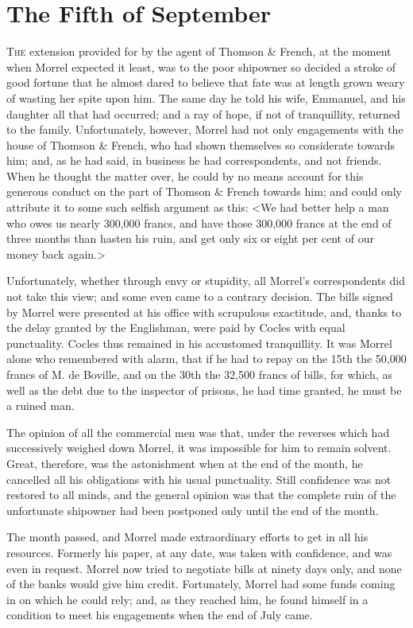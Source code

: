 \chapter{The Fifth of September} 

 \lettrine{T}{he} extension provided for by the agent of Thomson \& French, at the moment when Morrel expected it least, was to the poor shipowner so decided a stroke of good fortune that he almost dared to believe that fate was at length grown weary of wasting her spite upon him. The same day he told his wife, Emmanuel, and his daughter all that had occurred; and a ray of hope, if not of tranquillity, returned to the family. Unfortunately, however, Morrel had not only engagements with the house of Thomson \& French, who had shown themselves so considerate towards him; and, as he had said, in business he had correspondents, and not friends. When he thought the matter over, he could by no means account for this generous conduct on the part of Thomson \& French towards him; and could only attribute it to some such selfish argument as this: <We had better help a man who owes us nearly 300,000 francs, and have those 300,000 francs at the end of three months than hasten his ruin, and get only six or eight per cent of our money back again.> 

 Unfortunately, whether through envy or stupidity, all Morrel's correspondents did not take this view; and some even came to a contrary decision. The bills signed by Morrel were presented at his office with scrupulous exactitude, and, thanks to the delay granted by the Englishman, were paid by Cocles with equal punctuality. Cocles thus remained in his accustomed tranquillity. It was Morrel alone who remembered with alarm, that if he had to repay on the 15th the 50,000 francs of M. de Boville, and on the 30th the 32,500 francs of bills, for which, as well as the debt due to the inspector of prisons, he had time granted, he must be a ruined man. 

 The opinion of all the commercial men was that, under the reverses which had successively weighed down Morrel, it was impossible for him to remain solvent. Great, therefore, was the astonishment when at the end of the month, he cancelled all his obligations with his usual punctuality. Still confidence was not restored to all minds, and the general opinion was that the complete ruin of the unfortunate shipowner had been postponed only until the end of the month. 

 The month passed, and Morrel made extraordinary efforts to get in all his resources. Formerly his paper, at any date, was taken with confidence, and was even in request. Morrel now tried to negotiate bills at ninety days only, and none of the banks would give him credit. Fortunately, Morrel had some funds coming in on which he could rely; and, as they reached him, he found himself in a condition to meet his engagements when the end of July came. 

